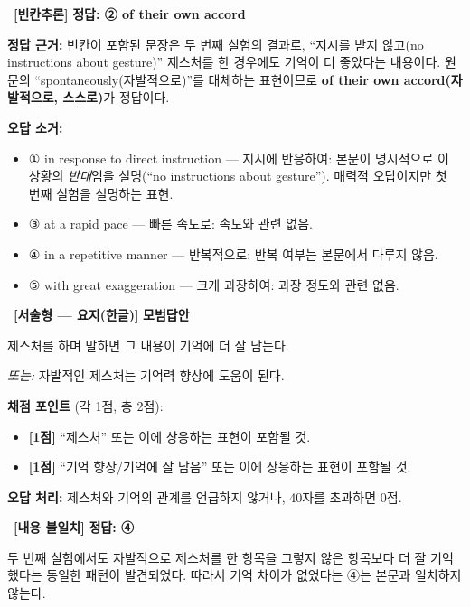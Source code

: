 \documentclass[11pt,a4paper]{article}
\newcommand{\qno}[1]{\par\vspace{10pt}\noindent{\sffamily\bfseries #1.}\ }
\begin{document}
\qno{2}\textbf{[빈칸추론]} \textbf{정답: ② of their own accord}

\par\vspace{4pt}
\textbf{정답 근거:} 빈칸이 포함된 문장은 두 번째 실험의 결과로, ``지시를 받지 않고(no instructions about gesture)'' 제스처를 한 경우에도 기억이 더 좋았다는 내용이다. 원문의 ``spontaneously(자발적으로)''를 대체하는 표현이므로 \textbf{of their own accord(자발적으로, 스스로)}가 정답이다.

\par\vspace{4pt}
\textbf{오답 소거:}
\begin{itemize}[leftmargin=2em,itemsep=2pt]
  \item ① in response to direct instruction — 지시에 반응하여: 본문이 명시적으로 이 상황의 \textit{반대}임을 설명(``no instructions about gesture''). 매력적 오답이지만 첫 번째 실험을 설명하는 표현.
  \item ③ at a rapid pace — 빠른 속도로: 속도와 관련 없음.
  \item ④ in a repetitive manner — 반복적으로: 반복 여부는 본문에서 다루지 않음.
  \item ⑤ with great exaggeration — 크게 과장하여: 과장 정도와 관련 없음.
\end{itemize}

\qno{3}\textbf{[서술형 — 요지(한글)]} \textbf{모범답안}

\par\vspace{6pt}
\begin{pbox}
제스처를 하며 말하면 그 내용이 기억에 더 잘 남는다.

\vspace{4pt}
\textit{또는:} 자발적인 제스처는 기억력 향상에 도움이 된다.
\end{pbox}

\par\vspace{6pt}
\textbf{채점 포인트} (각 1점, 총 2점):
\begin{itemize}[leftmargin=2em,itemsep=2pt]
  \item \textbf{[1점]} ``제스처'' 또는 이에 상응하는 표현이 포함될 것.
  \item \textbf{[1점]} ``기억 향상/기억에 잘 남음'' 또는 이에 상응하는 표현이 포함될 것.
\end{itemize}

\par\vspace{4pt}
\textbf{오답 처리:} 제스처와 기억의 관계를 언급하지 않거나, 40자를 초과하면 0점.

\vspace{8pt}
\qno{4}\textbf{[내용 불일치]} \textbf{정답: ④}
\par 두 번째 실험에서도 자발적으로 제스처를 한 항목을 그렇지 않은 항목보다 더 잘 기억했다는 동일한 패턴이 발견되었다. 따라서 기억 차이가 없었다는 ④는 본문과 일치하지 않는다.
\end{document}
